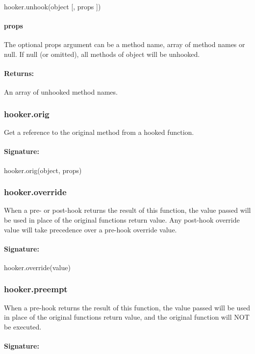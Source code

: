 {\ttfamily hooker.\+unhook(object \mbox{[}, props \mbox{]})} \paragraph*{{\ttfamily props}}

The optional {\ttfamily props} argument can be a method name, array of method names or null. If null (or omitted), all methods of {\ttfamily object} will be unhooked. \paragraph*{Returns\+:}

An array of unhooked method names.

\subsubsection*{hooker.\+orig}

Get a reference to the original method from a hooked function. \paragraph*{Signature\+:}

{\ttfamily hooker.\+orig(object, props)}

\subsubsection*{hooker.\+override}

When a pre-\/ or post-\/hook returns the result of this function, the value passed will be used in place of the original function\textquotesingle{}s return value. Any post-\/hook override value will take precedence over a pre-\/hook override value. \paragraph*{Signature\+:}

{\ttfamily hooker.\+override(value)}

\subsubsection*{hooker.\+preempt}

When a pre-\/hook returns the result of this function, the value passed will be used in place of the original function\textquotesingle{}s return value, and the original function will N\+O\+T be executed. \paragraph*{Signature\+:}

